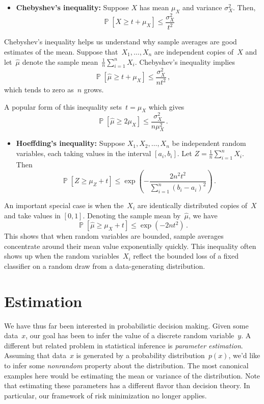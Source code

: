 \documentclass{tufte-book}
\begin{document}
\begin{itemize}
\tightlist
\item
  \textbf{Chebyshev's inequality:} Suppose \(X\) has mean \(\mu_X\) and
  variance \(\sigma_X^2\). Then, \[
  \mathop\mathbb{P}[X\geq t+\mu_X] \leq \frac{\sigma_X^2}{t^2}
  \]
\end{itemize}

Chebyshev's inequality helps us understand
why sample averages are good estimates of the mean. Suppose
that~\(X_1,\dots, X_n\) are independent copies of~\(X\) and
let~\(\hat\mu\) denote the sample mean~\(\frac1n\sum_{i=1}^n X_i.\)
Chebyshev's inequality implies \[
  \mathop\mathbb{P}[\hat\mu\geq t+\mu_X] \leq \frac{\sigma_X^2}{n t^2}\,,
\] which tends to zero as~\(n\) grows.

A popular form of this inequality sets~\(t=\mu_X\) which gives \[
  \mathop\mathbb{P}[\hat{\mu}\geq 2\mu_X] \leq \frac{\sigma_X^2}{n \mu_X^2}\,.
\]

\begin{itemize}
\tightlist
\item
  \textbf{Hoeffding's inequality:} Suppose \(X_1, X_2, \ldots, X_n\) be
  independent random variables, each taking values in the interval
  \([a_i,b_i]\). Let \(Z = \frac{1}{n}\sum_{i=1}^n X_i\). Then \[
  \mathop\mathbb{P}[Z\geq \mu_Z + t] \leq \exp\left(- \frac{2n^2t^2}{\sum_{i=1}^n(b_i-a_i)^2}\right)\,.
  \]
\end{itemize}

 An important special case is when
the~\(X_i\) are identically distributed copies of~\(X\) and take values
in \([0,1]\). Denoting the sample mean by~\(\hat\mu\), we have \[
  \mathop\mathbb{P}[\hat\mu \geq \mu_X + t] \leq \exp\left(- 2nt^2\right)\,.
\] This shows that when random variables are bounded, sample averages
concentrate around their mean value exponentially quickly. This
inequality often shows up when the random variables~\(X_i\) reflect the
bounded loss of a fixed classifier on a random draw from a
data-generating distribution.

\hypertarget{estimation}{%
\section{Estimation}\label{estimation}}

We have thus far been interested in probabilistic decision making. Given
some data~\(x\), our goal has been to infer the value of a discrete
random variable~\(y\). A different but related problem in statistical
inference is \emph{parameter estimation}. Assuming that data~\(x\) is
generated by a probability distribution~\(p(x)\), we'd like to infer
some \emph{nonrandom} property about the distribution. The most
canonical examples here would be estimating the mean or variance of the
distribution. Note that estimating these parameters has a different
flavor than decision theory. In particular, our framework of risk
minimization no longer
applies.
\end{document}
